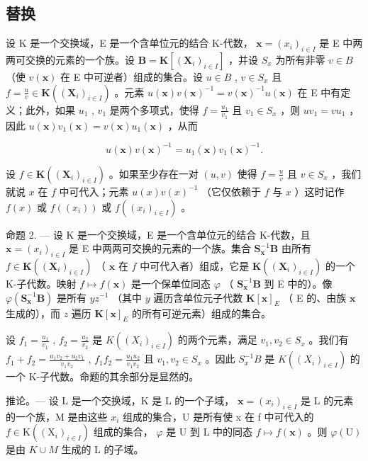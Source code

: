 \subsection{替换}

设 K 是一个交换域，E 是一个含单位元的结合 K-代数， \(\mathbf{x} = (x_i)_{i \in I}\) 是 E 中两两可交换的元素的一个族。设 \(\mathbf{B} = \mathbf{K}[(\mathbf{X}_i)_{i \in I}]\) ，并设 \(S_x\) 为所有非零 \(v \in B\) （使 \(v(\mathbf{x})\) 在 E 中可逆者）组成的集合。设 \(u \in B\) , \(v \in S_x\) 且 \(f = \frac{u}{v} \in \mathbf{K}((\mathbf{X}_i)_{i \in I})\) 。元素 \(u(\mathbf{x}) v(\mathbf{x})^{-1} = v(\mathbf{x})^{-1} u(\mathbf{x})\) 在 E 中有定义；此外，如果 \(u_1\) , \(v_1\) 是两个多项式，使得 \(f = \frac{u_1}{v_1}\) 且 \(v_1 \in S_x\) ，则 \(uv_1 = vu_1\) ，因此 \(u(\mathbf{x}) v_1(\mathbf{x}) = v(\mathbf{x}) u_1(\mathbf{x})\) ，从而

\[
u (\mathbf {x}) v (\mathbf {x}) ^ {- 1} = u _ {1} (\mathbf {x}) v _ {1} (\mathbf {x}) ^ {- 1}.
\]

设 \(f \in \mathbf{K}((\mathbf{X}_i)_{i \in I})\) 。如果至少存在一对 \((u, v)\) 使得 \(f = \frac{u}{v}\) 且 \(v \in S_x\) ，我们就说 \(x\) 在 \(f\) 中可代入；元素 \(u(x) v(x)^{-1}\) （它仅依赖于 \(f\) 与 \(x\) ）这时记作 \(f(x)\) 或 \(f((x_i))\) 或 \(f((x_i)_{i \in I})\) 。

命题 2. --- 设 K 是一个交换域，E 是一个含单位元的结合 K-代数，且 \(\mathbf{x} = (x_i)_{i \in I}\) 是 E 中两两可交换的元素的一个族。集合 \(\mathbf{S}_{\mathbf{x}}^{-1}\mathbf{B}\) 由所有 \(f \in \mathbf{K}((\mathbf{X}_i)_{i \in I})\) （ \(\mathbf{x}\) 在 \(f\) 中可代入者）组成，它是 \(\mathbf{K}((\mathbf{X}_i)_{i \in I})\) 的一个 K-子代数。映射 \(f \mapsto f(\mathbf{x})\) 是一个保单位同态 \(\varphi\) （ \(\mathbf{S}_{\mathbf{x}}^{-1}\mathbf{B}\) 到 E 中的）。像 \(\varphi(\mathbf{S}_{\mathbf{x}}^{-1}\mathbf{B})\) 是所有 \(yz^{-1}\) （其中 \(y\) 遍历含单位元子代数 \(\mathbf{K}[\mathbf{x}]_E\) （ E 的、由族 \(\mathbf{x}\) 生成的），而 \(z\) 遍历 \(\mathbf{K}[\mathbf{x}]_E\) 的所有可逆元素）组成的集合。

设 \(f_{1} = \frac{u_{1}}{v_{1}}\) , \(f_{2} = \frac{u_{2}}{v_{2}}\) 是 \(K((X_{i})_{i\in I})\) 的两个元素，满足 \(v_{1}, v_{2} \in S_{x}\) 。我们有 \(f_{1} + f_{2} = \frac{u_{1}v_{2} + u_{2}v_{1}}{v_{1}v_{2}}\) , \(f_{1}f_{2} = \frac{u_{1}u_{2}}{v_{1}v_{2}}\) 且 \(v_{1}, v_{2} \in S_{x}\) 。因此 \(S_{x}^{-1}B\) 是 \(K((X_{i})_{i\in I})\) 的一个 K-子代数。命题的其余部分是显然的。

推论。--- 设 L 是一个交换域，K 是 L 的一个子域， \(\mathbf{x} = (x_i)_{i \in I}\) 是 L 的元素的一个族，M 是由这些 \(x_i\) 组成的集合，U 是所有使 x 在 f 中可代入的 \(f \in \mathrm{K}((\mathrm{X}_i)_{i \in I})\) 组成的集合， \(\varphi\) 是 U 到 L 中的同态 \(f \mapsto f(\mathbf{x})\) 。则 \(\varphi(\mathrm{U})\) 是由 \(K \cup M\) 生成的 L 的子域。

